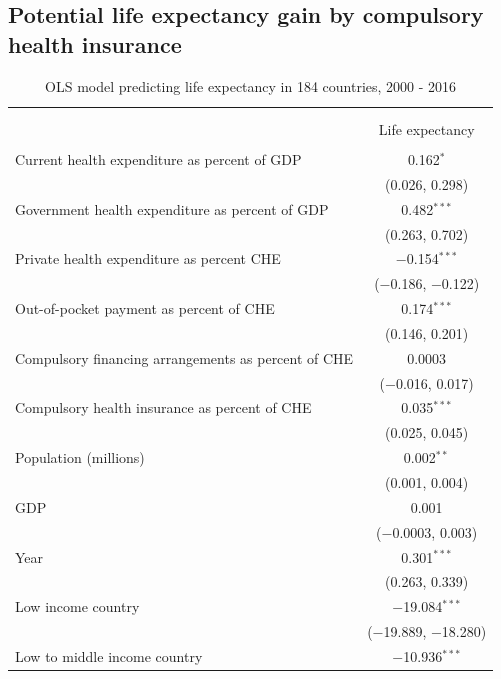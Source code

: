 \documentclass[]{elsarticle} %
\begin{document}
\hypertarget{potential-life-expectancy-gain-by-compulsory-health-insurance}{%
\subsection{Potential life expectancy gain by compulsory health insurance}\label{potential-life-expectancy-gain-by-compulsory-health-insurance}}

\begin{table}[H] \centering 
  \caption{OLS model predicting life expectancy in 184 countries, 2000 - 2016} 
  \label{poolOLS} 
\begin{tabular}{@{\extracolsep{5pt}}lc} 
\\[-1.8ex]\hline \\[-1.8ex] 
\\[-1.8ex] & Life expectancy \\ 
\hline \\[-1.8ex] 
 Current health expenditure as percent of GDP & 0.162$^{*}$ \\ 
  & (0.026, 0.298) \\ 
  Government health expenditure as percent of GDP & 0.482$^{***}$ \\ 
  & (0.263, 0.702) \\ 
  Private health expenditure as percent CHE & $-$0.154$^{***}$ \\ 
  & ($-$0.186, $-$0.122) \\ 
  Out-of-pocket payment as percent of CHE & 0.174$^{***}$ \\ 
  & (0.146, 0.201) \\ 
  Compulsory financing arrangements as percent of CHE & 0.0003 \\ 
  & ($-$0.016, 0.017) \\ 
  Compulsory health insurance as percent of CHE & 0.035$^{***}$ \\ 
  & (0.025, 0.045) \\ 
  Population (millions) & 0.002$^{**}$ \\ 
  & (0.001, 0.004) \\ 
  GDP & 0.001 \\ 
  & ($-$0.0003, 0.003) \\ 
  Year & 0.301$^{***}$ \\ 
  & (0.263, 0.339) \\ 
  Low income country & $-$19.084$^{***}$ \\ 
  & ($-$19.889, $-$18.280) \\ 
  Low to middle income country & $-$10.936$^{***}$ \\ 

\end{tabular}
\end{table}
\end{document}
